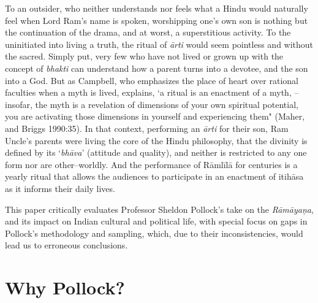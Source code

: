 To an outsider, who neither understands nor feels what a Hindu would naturally feel when Lord Ram’s name is spoken, worshipping one's own son is nothing but the continuation of the drama, and at worst, a superstitious activity. To the uninitiated into living a truth, the ritual of \textit{ārti} would seem pointless and without the sacred. Simply put, very few who have not lived or grown up with the concept of \textit{bhakti} can understand how a parent turns into a devotee, and the son into a God. But as Campbell, who emphasizes the place of heart over rational faculties when a myth is lived, explains, ‘a ritual is an enactment of a myth, – insofar, the myth is a revelation of dimensions of your own spiritual potential, you are activating those dimensions in yourself and experiencing them" (Maher, and Briggs 1990:35). In that context, performing an \textit{ārti} for their son, Ram Uncle’s parents were living the core of the Hindu philosophy, that the divinity is defined by its ‘\textit{bhāva}’ (attitude and quality), and neither is restricted to any one form nor are other–worldly. And the performance of Rāmlīlā for centuries is a yearly ritual that allows the audiences to participate in an enactment of itihāsa as it informs their daily lives.

This paper critically evaluates Professor Sheldon Pollock’s take on the \textit{Rāmāyaṇa}, and its impact on Indian cultural and political life, with special focus on gaps in Pollock’s methodology and sampling, which, due to their inconsistencies, would lead us to erroneous conclusions.


\section*{Why Pollock?}

